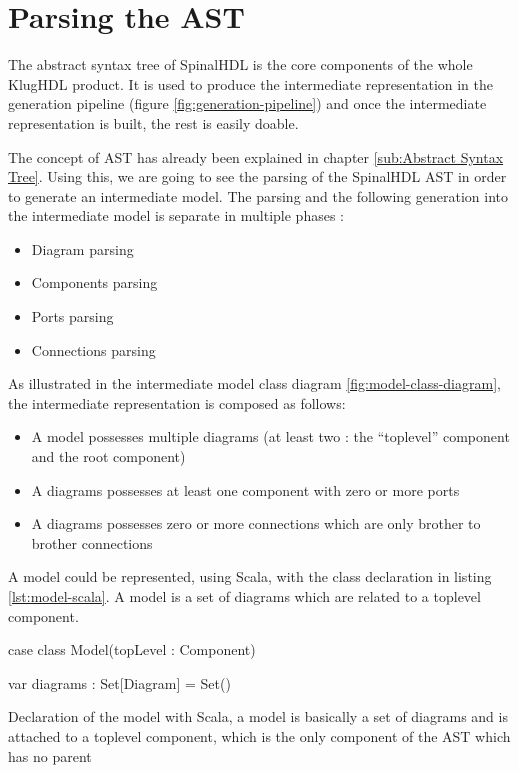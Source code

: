 \chapter{Parsing the AST}
\label{chap:parsing-ast}

The abstract syntax tree of SpinalHDL is the core components of the whole KlugHDL
product. It is used to produce the intermediate representation in the generation
pipeline (figure \ref{fig:generation-pipeline}) and once the intermediate
representation is built, the rest is easily doable.

The concept of AST has already been explained in chapter \ref{sub:Abstract Syntax
  Tree}. Using this, we are going to see the parsing of the SpinalHDL AST in
order to generate an intermediate model. The parsing and the following
generation into the intermediate model is separate in multiple
phases :

\begin{itemize}
\item Diagram parsing
\item Components parsing
\item Ports parsing
\item Connections parsing
\end{itemize}

As illustrated in the intermediate model class diagram
\ref{fig:model-class-diagram}, the intermediate representation is composed as follows:
\begin{itemize}
\item A model possesses multiple diagrams (at least two : the ``toplevel'' component and the
  root component)
\item A diagrams possesses at least one component with zero or more ports
\item A diagrams possesses zero or more connections which are only brother to
  brother connections
\end{itemize}

A model could be represented, using Scala, with the class declaration in listing
\ref{lst:model-scala}. A model is a set of diagrams which are related to a
toplevel component.

\begin{listing}[H]
  \centering
  \begin{scalacode}
    case class Model(topLevel : Component) {

      var diagrams : Set[Diagram] = Set()
  }
\end{scalacode}
\caption[Model class declaration]{Declaration of the model with Scala, a model
  is basically a set of diagrams and is attached to a toplevel component, which
  is the only component of the AST which has no parent}
\label{lst:model-scala}
\end{listing}

